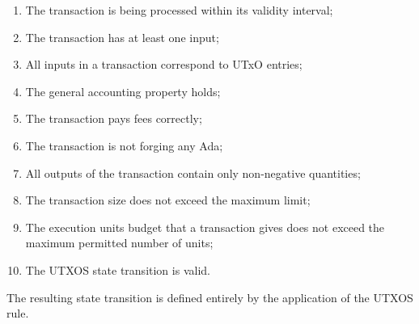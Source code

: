 \begin{enumerate}
  \item The transaction is being processed within its validity interval;

  \item The transaction has at least one input;

  \item All inputs in a transaction correspond to UTxO entries;

  \item The general accounting property holds;

  \item The transaction pays fees correctly;

  \item The transaction is not forging any Ada;

  \item All outputs of the transaction contain only non-negative quantities;

  \item The transaction size does not exceed the maximum limit;

 \item The execution units budget that a transaction gives does not exceed the maximum
  permitted number of units;

  \item The UTXOS state transition is valid.
\end{enumerate}

The resulting state transition is defined entirely by the application of the
UTXOS rule.

